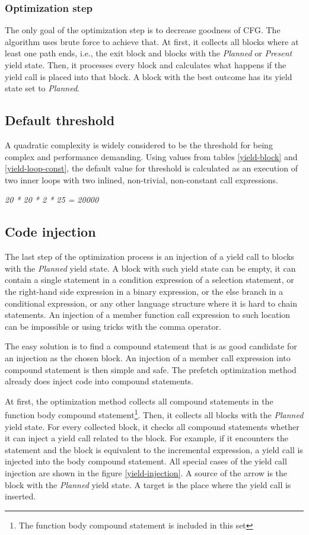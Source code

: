 \subsubsection{Optimization step}
The only goal of the optimization step is to decrease goodness of CFG. The algorithm uses brute force to achieve that. At first, it collects all blocks where at least one path ends, i.e., the exit block and blocks with the \emph{Planned} or \emph{Present} yield state. Then,  it processes every block and calculates what happens if the yield call is placed into that block. A block with the best outcome has its yield state set to \emph{Planned}.

\subsection{Default threshold}
\label{yield-default}
A quadratic complexity is widely considered to be the threshold for being complex and performance demanding. Using values from tables \ref{yield-block} and \ref{yield-loop-const}, the default value for threshold is calculated as an execution of two inner  loops with two inlined, non-trivial, non-constant call expressions.

\begin{center}
\emph{20 * 20 * 2 * 25 = 20000}
\end{center}

\subsection{Code injection}
The last step of the optimization process is an injection of a yield call to blocks with the \emph{Planned} yield state. A block with such yield state can be empty, it can contain a single statement in a condition expression of a selection statement, or the right-hand side expression in a binary expression, or the else branch in a conditional expression, or any other language structure where it is hard to chain statements. An injection of a member function call expression to such location can be impossible or using tricks with the comma operator.

The easy solution is to find a compound statement that is as good candidate for an injection as the chosen block. An injection of a member call expression into compound statement is then simple and safe. The prefetch optimization method already does inject code into compound statements.

At first, the optimization method collects all compound statements in the function body compound statement\footnote{The function body compound statement is included in this set}. Then, it collects all blocks with the \emph{Planned} yield state. For every collected block, it checks all compound statements whether it can inject a yield call related to the block. For example, if it encounters the  statement and the block is equivalent to the incremental expression, a yield call is injected into the body compound statement. All special cases of the yield call injection are shown in the figure \ref{yield-injection}. A source of the arrow is the block with the \emph{Planned} yield state. A target is the place where the yield call is inserted.


